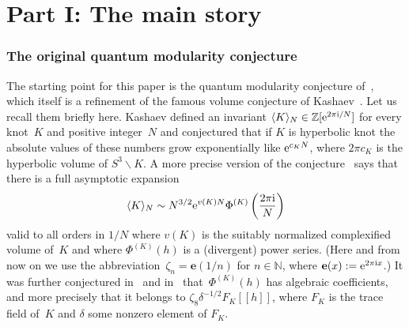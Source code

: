 \documentclass[pdftex]{sigma}
\numberwithin{equation}{section}
\def\BZ{\mathbb Z}
\def\la{\langle}
\def\ra{\rangle}
\def\z{\zeta}
\def\e{\mathbf{e}}
\def\N{\mathbb N}
\def\e{\mathbf{e}}
\def\z{\zeta}
\def\be{\begin{equation}}
\def\ee{\end{equation}}
\def\ssm{\smallsetminus}
\begin{document}
\part*{Part I: The main story}

\section{The original quantum modularity conjecture}
\label{sec.QMCK}

The starting point for this paper is the quantum modularity conjecture
of~\cite{Za:QMF}, which itself is a refinement of the famous volume conjecture
of Kashaev~\cite{K95}. Let us recall them briefly here.
Kashaev defined an invariant $\la K \ra_N \in \BZ[{\rm e}^{2 \pi {\rm i}/N}]$ for every
knot~$K$ and positive integer~$N$ and conjectured that if $K$ is hyperbolic
knot the absolute values of these numbers grow exponentially like ${\rm e}^{c_KN}$,
where $2\pi c_K$ is the hyperbolic volume of $S^3\ssm K$. A more precise version
of the conjecture~\cite{Gu} says that there is a full asymptotic expansion
\be
\label{K1}
\la K \ra_N  \sim
N^{3/2} {\rm e}^{v(K)N} \Phi^{(K)} \left(\frac{2\pi {\rm i}}N\right)
\ee
valid to all orders in $1/N$ where $v(K)$ is the suitably normalized complexified
volume of~$K$ and where $\Phi^{(K)}(h)$ is a (divergent) power series. \big(Here and
from now on we use the abbreviation~${\z_n=\e(1/n)}$ for $n\in\N$, where
$\e(x):={\rm e}^{2\pi{\rm i}x}$.\big) It was further conjectured in~\cite{DGLZ} and in~\cite{Ga:CS}
that~$\Phi^{(K)}(h)$ has algebraic coefficients, and more precisely that
it belongs to $\z_8 \delta^{-1/2}F_K[[h]]$, where $F_K$ is the trace
field of~$K$ and $\delta$ some nonzero element of $F_K$.
\end{document}
